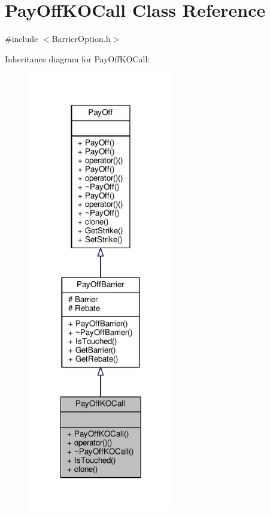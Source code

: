 \hypertarget{classPayOffKOCall}{}\section{Pay\+Off\+K\+O\+Call Class Reference}
\label{classPayOffKOCall}


{\ttfamily \#include $<$Barrier\+Option.\+h$>$}



Inheritance diagram for Pay\+Off\+K\+O\+Call\+:
\nopagebreak
\begin{figure}[H]
\begin{center}
\leavevmode
\includegraphics[width=180pt]{classPayOffKOCall__inherit__graph}
\end{center}
\end{figure}


